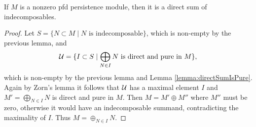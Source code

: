 \begin{theorem}\label{thm:indecomposableDecomposition}
    If $M$ is a nonzero pfd persistence module, then it is a direct sum of indecomposables.
\end{theorem}
\begin{proof}
    Let $S=\{N\subset M\mid N\text{ is indecomposable}\}$, which is non-empty by the previous lemma, and 
    \[\mathcal{U}=\{I\subset S\mid\bigoplus_{N\in I}N\text{ is direct and pure in }M\},\]
    which is non-empty by the previous lemma and Lemma \ref{lemma:directSumIsPure}.
    Again by Zorn's lemma it follows that $\mathcal{U}$ has a maximal element $I$ and $M'=\bigoplus_{N\in I} N$ is direct and pure in $M$.
    Then $M=M'\oplus M''$ where $M''$ must be zero, otherwise it would have an indecomposable summand, contradicting the maximality of $I$.
    Thus $M=\oplus_{N\in I}N$. 
\end{proof}